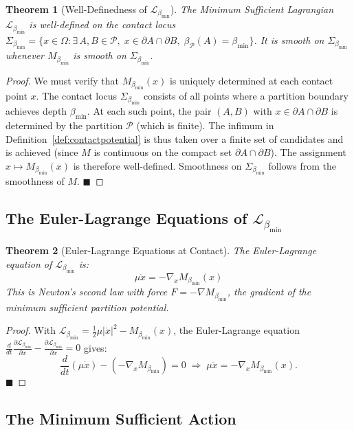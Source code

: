 \documentclass[11pt,twocolumn,a4paper]{article}
\theoremstyle{plain}
\newtheorem{theorem}{Theorem}[section]
\theoremstyle{definition}
\theoremstyle{remark}
\newcommand{\bmin}{\beta_{\min}}
\newcommand{\Lmin}{\mathcal{L}_{\bmin}}
\newcommand{\Pcal}{\mathcal{P}}
\newcommand{\half}{\tfrac{1}{2}}
\renewcommand{\qed}{\hfill$\blacksquare$}
\begin{document}
\begin{theorem}[Well-Definedness of $\Lmin$]
\label{thm:welldefined}
The Minimum Sufficient Lagrangian $\Lmin$ is well-defined on the contact locus
$\Sigma_{\bmin} = \{x \in \Omega : \exists\, A,B \in \Pcal,\;x \in \partial A
\cap \partial B,\;\beta_\Pcal(A) = \bmin\}$. It is smooth on $\Sigma_{\bmin}$
whenever $M_{\bmin}$ is smooth on $\Sigma_{\bmin}$.
\end{theorem}

\begin{proof}
We must verify that $M_{\bmin}(x)$ is uniquely determined at each contact point
$x$. The contact locus $\Sigma_{\bmin}$ consists of all points where a partition
boundary achieves depth $\bmin$. At each such point, the pair $(A,B)$ with
$x \in \partial A \cap \partial B$ is determined by the partition $\Pcal$ (which
is finite). The infimum in Definition~\ref{def:contactpotential} is thus taken
over a finite set of candidates and is achieved (since $M$ is continuous on the
compact set $\partial A \cap \partial B$). The assignment $x \mapsto M_{\bmin}(x)$
is therefore well-defined. Smoothness on $\Sigma_{\bmin}$ follows from the
smoothness of $M$. \qed
\end{proof}

\subsection{The Euler-Lagrange Equations of $\Lmin$}

\begin{theorem}[Euler-Lagrange Equations at Contact]
\label{thm:el}
The Euler-Lagrange equation of $\Lmin$ is:
\[
  \mu\ddot{x} = -\nabla_x M_{\bmin}(x)
\]
This is Newton's second law with force $F = -\nabla M_{\bmin}$, the gradient of
the minimum sufficient partition potential.
\end{theorem}

\begin{proof}
With $\Lmin = \half\mu|\dot{x}|^2 - M_{\bmin}(x)$, the Euler-Lagrange equation
$\frac{d}{dt}\frac{\partial\Lmin}{\partial\dot{x}} - \frac{\partial\Lmin}
{\partial x} = 0$ gives:
\[
  \frac{d}{dt}(\mu\dot{x}) - (-\nabla_x M_{\bmin}) = 0
  \;\Longrightarrow\;
  \mu\ddot{x} = -\nabla_x M_{\bmin}(x).
\]
\qed
\end{proof}

\subsection{The Minimum Sufficient Action}
\end{document}
